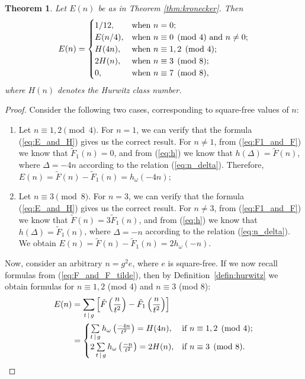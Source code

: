 \documentclass{mcom-l}
\newtheorem{thm}{Theorem}[section]
\theoremstyle{definition}
\begin{document}
\begin{thm} \label{thm:E_and_H}
Let $E(n)$ be as in Theorem \ref{thm:kronecker}. Then
\begin{equation} \label{eq:E_and_H}
E(n) = \begin{cases}
1/12, & \textnormal{when $n = 0$;}\\
E(n/4), & \textnormal{when $n \equiv 0 \pmod{4}$ and $n \neq 0$};\\
H(4n), & \textnormal{when $n \equiv 1, 2 \pmod{4}$;}\\
2H(n), & \textnormal{when $n \equiv 3 \pmod{8}$;}\\
0, & \textnormal{when $n \equiv 7 \pmod{8}$},
\end{cases}
\end{equation}
where $H(n)$ denotes the Hurwitz class number.
\end{thm}
\begin{proof}
Consider the following two cases, corresponding to square-free values of $n$:
\begin{enumerate}
\item Let $n \equiv 1, 2 \pmod{4}$. For $n = 1$, we can verify that
  the formula (\ref{eq:E_and_H}) gives us the correct result. For $n
  \neq 1$, from (\ref{eq:F1_and_F}) we know that $\tilde{F}_1(n) = 0$,
  and from (\ref{eq:h}) we know that $h(\Delta) = \tilde{F}(n)$, where
  $\Delta = -4n$ according to the relation
  (\ref{eq:n_delta}). Therefore, $E(n) = \tilde{F}(n) - \tilde{F}_1(n)
  = h_\omega(-4n)$;

\item Let $n \equiv 3 \pmod{8}$. For $n = 3$, we can verify that the
  formula (\ref{eq:E_and_H}) gives us the correct result. For $n \neq
  3$, from (\ref{eq:F1_and_F}) we know that $\tilde{F}(n) =
  3\tilde{F}_1(n)$, and from (\ref{eq:h}) we know that $h(\Delta) =
  \tilde{F}_1(n)$, where $\Delta = -n$ according to the relation
  (\ref{eq:n_delta}). We obtain $E(n) = \tilde{F}(n)-\tilde{F}_1(n) =
  2h_\omega(-n)$.
\end{enumerate}

Now, consider an arbitrary $n = g^2e$, where $e$ is square-free. If we
now recall formulas from (\ref{eq:F_and_F_tilde}), then by
Definition~\ref{defin:hurwitz} we obtain formulas for $n \equiv 1, 2$ (mod 4) and
$n \equiv 3$ (mod 8):
\begin{align*}
E(n) &= \sum\limits_{t\,|\,g}\left[\tilde{F}\left(\frac{n}{t^2}\right)
  - \tilde{F}_1\left(\frac{n}{t^2}\right)\right] \\
&= \begin{cases}
\sum\limits_{t\,|\,g}h_\omega\left(\frac{-4n}{t^2}\right) = H(4n), &
\textnormal{if $n \equiv 1, 2 \pmod{4}$;}\\
2\sum\limits_{t\,|\,g}h_\omega\left(\frac{-n}{t^2}\right) = 2H(n), &
\textnormal{if $n \equiv 3 \pmod{8}$. \qedhere} \\
\end{cases}
\end{align*}
\end{proof}
\end{document}

